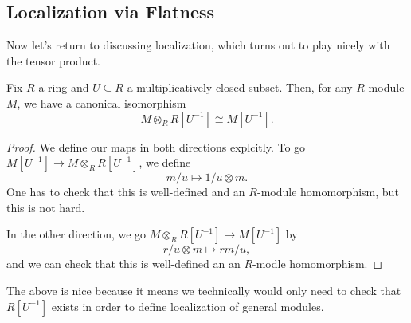 \subsection{Localization via Flatness}
Now let's return to discussing localization, which turns out to play nicely with the tensor product.
\begin{proposition}
	Fix $R$ a ring and $U\subseteq R$ a multiplicatively closed subset. Then, for any $R$-module $M$, we have a canonical isomorphism
	\[M\otimes_RR\left[U^{-1}\right]\cong M\left[U^{-1}\right].\]
\end{proposition}
\begin{proof}
	We define our maps in both directions explcitly. To go $M\left[U^{-1}\right]\to M\otimes_R R\left[U^{-1}\right]$, we define
	\[m/u\mapsto1/u\otimes m.\]
	One has to check that this is well-defined and an $R$-module homomorphism, but this is not hard.

	In the other direction, we go $M\otimes_RR\left[U^{-1}\right]\to M\left[U^{-1}\right]$ by
	\[r/u\otimes m\mapsto rm/u,\]
	and we can check that this is well-defined an an $R$-modle homomorphism.
\end{proof}
The above is nice because it means we technically would only need to check that $R\left[U^{-1}\right]$ exists in order to define localization of general modules.

